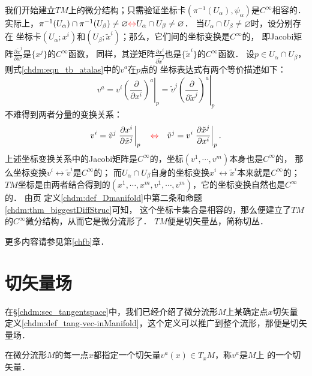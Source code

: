 我们开始建立$TM$上的微分结构；只需验证坐标卡$(\pi^{-1} (U_\alpha),\psi_\alpha)$是$C^\infty$相容的．
实际上，$\pi^{-1} (U_\alpha) \cap \pi^{-1} (U_\beta) \neq \varnothing {\color{red}\Leftrightarrow}
U_\alpha \cap U_\beta \neq \varnothing$．
当$U_\alpha \cap U_\beta \neq \varnothing$时，设分别存在
坐标卡$(U_\alpha;x^i)$和$(U_\beta;\tilde{x}^i)$；那么，它们间的坐标变换是$C^\infty$的，
即Jacobi矩阵$\frac{\partial \tilde{x}^j}{\partial {x}^i}$是$\{x^j\}$的$C^\infty$函数，
同样，其逆矩阵$\frac{\partial {x}^i}{\partial \tilde{x}^j}$也是$\{\tilde{x}^i\}$的$C^\infty$函数．
设$p \in U_\alpha \cap U_\beta$，则式\eqref{chdm:eqn_tb_atalas}中的$v^a$在$p$点的
坐标表达式有两个等价描述如下：
\begin{equation}
    v^a = v^i \left. \left(\frac{\partial }{\partial x^i}\right)^a \right | _p
        = \tilde{v}^j \left. \left(\frac{\partial }{\partial \tilde{x}^j}\right)^a  \right | _p
\end{equation}
不难得到两者分量的变换关系：
\begin{equation}\label{chdm:eqn_tbv}
    v^i = \tilde{v}^j \left. \frac{\partial {x}^i}{\partial \tilde{x}^j}  \right | _p
    {\quad \color{red}\Leftrightarrow \quad}
    \tilde{v}^j = {v}^i \left. \frac{\partial \tilde{x}^j}{\partial {x}^i}  \right | _p .
\end{equation}
上述坐标变换关系中的Jacobi矩阵是$C^\infty$的，坐标$(v^1,\cdots,v^m)$本身也是$C^\infty$的，
那么坐标变换$v^i \leftrightarrow \tilde{v}^i$是$C^\infty$的；
而$U_\alpha \cap U_\beta$自身的坐标变换$x^i \leftrightarrow \tilde{x}^i$本来就是$C^\infty$的；
$TM$坐标是由两者结合得到的$(x^1,\cdots,x^m,v^1,\cdots,v^m)$，它的坐标变换自然也是$C^\infty$的．
由\pageref{chdm:def_Dmanifold}页
定义\ref{chdm:def_Dmanifold}中第二条和命题\ref{chdm:thm_biggestDiffStruc}可知，
这个坐标卡集合是{\kaishu 相容的}，那么便建立了$TM$的$C^\infty$微分结构，从而它是微分流形了．
$TM$便是切矢量丛，简称切丛．

更多内容请参见第\ref{chfb}章．



\section{切矢量场}\label{chdm:sec_tangent-vector-field}
在\S\ref{chdm:sec_tangentspace}中，我们已经介绍了微分流形$M$上某确定点$x$切矢量
定义\ref{chdm:def_tang-vec-inManifold}，这个定义可以推广到整个流形，那便是切矢量场．
\begin{definition}\label{chdm:def_tangent-vector-field}
    在微分流形$M$的每一点$x$都指定一个切矢量$v^a(x)\in T_xM$，称$v^a$是$M$上
    的一个{\heiti 切矢量}．
\end{definition}


